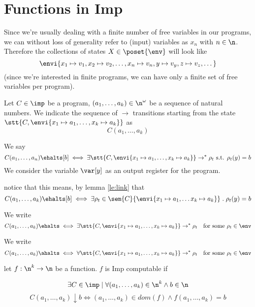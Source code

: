 \section{Functions in Imp}
Since we're usually dealing with a finite number of free variables in
our programs, we can without loss of generality refer to (input)
variables as \(x_n\) with \(n\in\n\). Therefore the collections of
states \(X\in\poset{\env}\) will look like \[\envi{x_1\mapsto v_1, x_2
  \mapsto v_2, \dots, x_n\mapsto v_n, y \mapsto v_y, z \mapsto v_z,
  \dots}\] (since we're interested in finite programs, we can have
only a finite set of free variables per program).

\begin{notation}
  Let \(C\in\imp\) be a program, \((a_1, \dots, a_k) \in \n^\omega\)
  be a sequence of natural numbers. We indicate the sequence of
  \(\to\) transitions starting from the state
  \(\stt{C,\envi{x_1\mapsto a_1, \dots, x_k\mapsto a_k}}\) as \[C(a_1,
  \dots, a_k)\]
\end{notation}

\begin{notation}
  We say \[C(a_1,\dots, a_n)\ehalts[b] \iff \exists \stt{C, \envi{x_1
      \mapsto a_1, \dots, x_k \mapsto a_k}} \to^* \rho_t \text{ s.t. }
  \rho_t(y) = b\] We consider the variable \(\var[y]\) as an output
  register for the program.
\end{notation}

\begin{observation}
  notice that this means, by lemma \ref{le:link} that \[C(a_1, \dots,
  a_k) \ehalts[b] \iff \exists \rho_t \in \sem{C}\{\envi{x_1 \mapsto
    a_1, \dots x_k \mapsto a_k}\} \; . \; \rho_t(y) = b\]
\end{observation}

\begin{notation}
  We write \[C(a_1, \dots, a_k) \ehalts \iff \exists \stt{C, \envi{x_1
      \mapsto a_1, \dots, x_k \mapsto a_k}} \to^* \rho_t \quad
  \text{for some } \rho_t\in \env\]
\end{notation}

\begin{notation}
  We write \[C(a_1, \dots, a_k) \ahalts \iff \forall \stt{C, \envi{x_1
      \mapsto a_1, \dots, x_k \mapsto a_k}} \to^* \rho_t \quad
  \text{for some } \rho_t\in \env\]
\end{notation}

\begin{definition}
  let \(f : \n^k \to \n\) be a function. \(f\) is Imp computable if

  \[\exists C \in\imp \mid \forall (a_1, \dots, a_k) \in \n^k \wedge
  b \in \n \] \[C(a_1, \dots, a_k) \downarrow b \iff (a_1, \dots,
  a_k) \in dom(f) \wedge f(a_1,\dots,a_k) = b\]
\end{definition}

